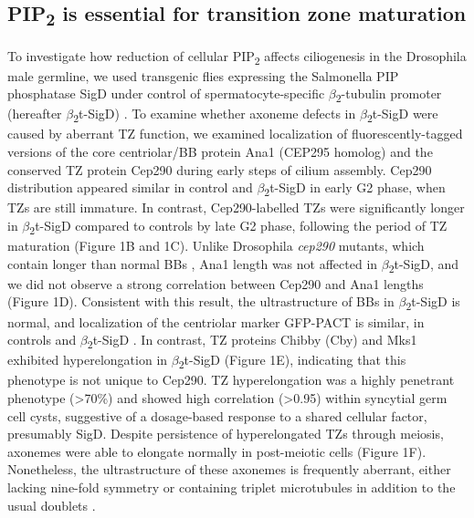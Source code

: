 \documentclass[12pt, twoside, letterpaper]{article}
\newcommand{\PIP}{PIP\textsubscript{2}}
\newcommand{\sigd}{$\beta$\textsubscript{2}t-SigD}
\begin{document}
\begin{doublespacing}
\begin{linenumbers}
    \subsection*{\PIP{} is essential for transition zone maturation}
    To investigate how reduction of cellular \PIP{} affects ciliogenesis in the
    Drosophila male germline,
    we used transgenic flies expressing the Salmonella PIP phosphatase SigD
    under control of spermatocyte-specific $\beta$\textsubscript{2}-tubulin promoter
    (hereafter \sigd{})
    \citep{wei2008depletion}.
    To examine whether axoneme defects in \sigd{}
    \citep{wei2008depletion}
    were caused by aberrant TZ function,
    we examined localization of fluorescently-tagged versions of the
    core centriolar/BB protein
    Ana1 (CEP295 homolog) \citep{goshima2007genes, blachon2009proximal}
    and the conserved TZ protein Cep290 \citep{basiri2014migrating}
    during early steps of cilium assembly.
    Cep290 distribution appeared similar in control and \sigd{} in early G2 phase,
    when TZs are still immature.
    In contrast, Cep290-labelled TZs were significantly longer in \sigd{}
    compared to controls by late G2 phase, following
    the period of TZ maturation (Figure 1B and 1C).
    Unlike Drosophila \textit{cep290} mutants, which contain
    longer than normal BBs \citep{basiri2014migrating},
    Ana1 length was not affected in \sigd{},
    and we did not observe a strong
    correlation between Cep290 and Ana1 lengths (Figure 1D).
    Consistent with this result, the ultrastructure of BBs in \sigd{}
    is normal, and localization of the centriolar
    marker GFP-PACT \citep{basto2006flies}
    is similar, in controls and \sigd{} \citep{wei2008depletion}.
    In contrast, TZ proteins Chibby (Cby) \citep{enjolras2012drosophila} and
    Mks1 \citep{vieillard2016transition, pratt2016drosophila}
    exhibited hyperelongation in \sigd{} (Figure 1E),
    indicating that this phenotype is not unique to Cep290.
    TZ hyperelongation was a highly penetrant phenotype (\textgreater 70\%)
    and showed high correlation (\textgreater 0.95)
    within syncytial germ cell cysts,
    suggestive of a dosage-based response to a shared cellular factor,
    presumably SigD.
    Despite persistence of hyperelongated TZs through meiosis,
    axonemes were able to
    elongate normally in post-meiotic cells (Figure 1F).
    Nonetheless, the ultrastructure of these axonemes
    is frequently aberrant,
    either lacking nine-fold symmetry or containing triplet microtubules
    in addition to the usual doublets \citep{wei2008depletion}.


\end{linenumbers}
\end{doublespacing}
\end{document}
